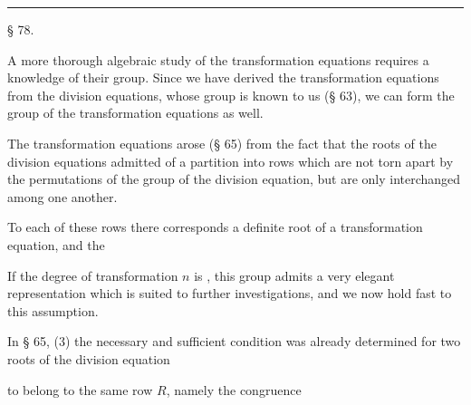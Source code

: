 \begin{center}

\end{center}

\noindent\rule{0.3\textwidth}{0.4pt}

\begin{center}
§ 78.

\end{center}

A more thorough algebraic study of the transformation equations requires a
knowledge of their  group. Since we have derived the transformation
equations from the division equations, whose group is known to us (§ 63), we
can form the group of the transformation equations as well.

The transformation equations arose (§ 65) from the fact that the roots of the
division equations admitted of a partition into rows which are not torn apart
by the permutations of the group of the division equation, but are only
interchanged among one another.

To each of these rows there corresponds a definite root of a transformation
equation, and the 

If the degree of transformation $n$ is , this group admits a
very elegant representation which is suited to further investigations, and we
now hold fast to this assumption.

In § 65, (3) the necessary and sufficient condition was already determined for
two roots of the division equation


to belong to the same row $R$, namely the congruence


